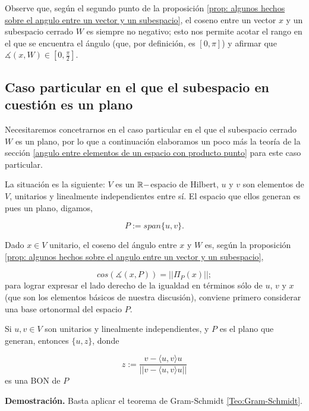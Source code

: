 \QEDB
\vspace{0.2cm}

\begin{nota}
Observe que, según el segundo punto de la proposición 
\ref{prop: algunos hechos sobre el angulo entre un vector y un subespacio}, 
el coseno entre un vector $x$ y un subespacio cerrado $W$ es
siempre no negativo; esto nos permite acotar el rango en el que
se encuentra el ángulo (que, por definición, es $[0, \pi]$)
y afirmar que $\measuredangle(x, W) \in [0, \frac{\pi}{2}]$.
\end{nota}

\subsection{Caso particular en el que el subespacio en cuestión es un plano}
\label{ap: Caso particular en el que el subespacio en cuestión es un plano}

Necesitaremos concetrarnos en el caso
particular en el que el subespacio cerrado $W$ es 
un plano, por lo que a continuación elaboramos un poco más
la teoría de la sección 
\ref{angulo entre elementos de un espacio con producto punto}
para este caso particular.

La situación es la siguiente: $V$ es un $\mathbb{R}-$espacio
de Hilbert, $u$ y $v$ son elementos de $V$,
unitarios y linealmente
independientes entre sí. El espacio que ellos generan
es pues un plano, digamos,


\[
P := span \{ u, v \}.
\]

Dado $x \in V$ unitario, 
el coseno del ángulo entre $x$ y $W$ es,
según la proposición
\ref{prop: algunos hechos sobre el angulo entre un vector y un subespacio},

\begin{equation}
\label{eq0: 19Marzo}
cos \left( \measuredangle (x, P) \right) = || \Pi_{P}(x) ||;
\end{equation}
para lograr expresar el lado derecho de la igualdad en términos
sólo de $u$, $v$ y $x$ (que son los elementos básicos de
nuestra discusión), conviene primero considerar una base
ortonormal del espacio $P$.


\begin{obs}
Si $u, v \in V$ son unitarios y linealmente independientes, y $P$
es el plano que generan, entonces
$\{ u, z \}$, donde

\begin{equation}
\label{eq2: 19Marzo}
z:= \frac{v- \langle u, v \rangle u}{||v- \langle u, v \rangle u||}
\end{equation}
es una BON de $P$
\end{obs}
\noindent
\textbf{Demostración.}
Basta aplicar el teorema de Gram-Schmidt 
\ref{Teo:Gram-Schmidt}.
\QEDB
\vspace{0.2cm}

